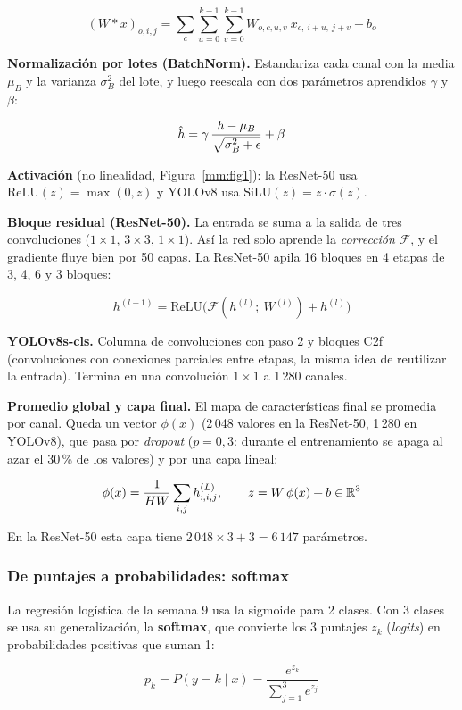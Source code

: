 \[
(W * x)_{o,i,j} = \sum_{c} \sum_{u=0}^{k-1} \sum_{v=0}^{k-1} W_{o,c,u,v}\ x_{c,\ i+u,\ j+v} + b_o
\]

\textbf{Normalización por lotes (BatchNorm).} Estandariza cada canal con la media $\mu_B$ y la varianza $\sigma_B^2$ del lote, y luego reescala con dos parámetros aprendidos $\gamma$ y $\beta$:

\[
\hat{h} = \gamma\thinspace  \frac{h - \mu_B}{\sqrt{\sigma_B^2 + \epsilon}} + \beta
\]

\textbf{Activación} (no linealidad, Figura~\ref{mm:fig1}): la ResNet-50 usa $\text{ReLU}(z) = \max(0, z)$ y YOLOv8 usa $\text{SiLU}(z) = z \cdot \sigma(z)$.

\textbf{Bloque residual (ResNet-50).} La entrada se suma a la salida de tres convoluciones ($1{\times}1$, $3{\times}3$, $1{\times}1$). Así la red solo aprende la \emph{corrección} $\mathcal{F}$, y el gradiente fluye bien por 50 capas. La ResNet-50 apila 16 bloques en 4 etapas de 3, 4, 6 y 3 bloques:

\[
h^{(l+1)} = \text{ReLU}\big(\mathcal{F}(h^{(l)};\ W^{(l)}) + h^{(l)}\big)
\]

\textbf{YOLOv8s-cls.} Columna de convoluciones con paso 2 y bloques C2f (convoluciones con conexiones parciales entre etapas, la misma idea de reutilizar la entrada). Termina en una convolución $1{\times}1$ a 1\,280 canales.

\textbf{Promedio global y capa final.} El mapa de características final se promedia por canal. Queda un vector $\phi(x)$ (2\,048 valores en la ResNet-50, 1\,280 en YOLOv8), que pasa por \emph{dropout} ($p = 0{,}3$: durante el entrenamiento se apaga al azar el 30\,\% de los valores) y por una capa lineal:

\[
\phi(x) = \frac{1}{HW}\sum_{i,j} h^{(L)}_{:,i,j}, \qquad z = W\thinspace \phi(x) + b \in \mathbb{R}^3
\]

En la ResNet-50 esta capa tiene $2\,048 \times 3 + 3 = 6\,147$ parámetros.

\subsubsection{De puntajes a probabilidades: softmax}
\label{mm:2.2}
La regresión logística de la semana 9 usa la sigmoide para 2 clases. Con 3 clases se usa su generalización, la \textbf{softmax}, que convierte los 3 puntajes $z_k$ (\emph{logits}) en probabilidades positivas que suman 1:

\[
p_k = P(y = k \mid x) = \frac{e^{z_k}}{\sum_{j=1}^{3} e^{z_j}}
\]

